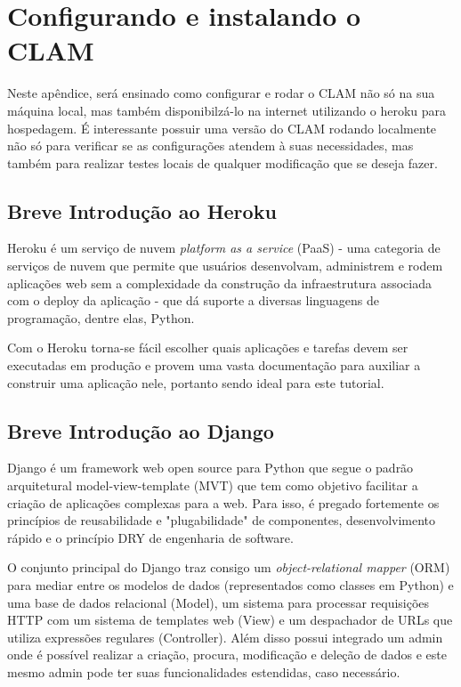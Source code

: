 \chapter{Configurando e instalando o CLAM}
\label{chap:clam}

Neste apêndice, será ensinado como configurar e rodar o CLAM não só na sua máquina
local, mas também disponibilzá-lo na internet utilizando o heroku para hospedagem.
É interessante possuir uma versão do CLAM rodando localmente não só para verificar
se as configurações atendem à suas necessidades, mas também para realizar testes locais
de qualquer modificação que se deseja fazer.

\section{Breve Introdução ao Heroku}

Heroku é um serviço de nuvem \textit{platform as a service} (PaaS) -  uma categoria de serviços de
nuvem que permite que usuários desenvolvam, administrem e rodem aplicações web sem a complexidade
da construção da infraestrutura associada com o deploy da aplicação -  que dá suporte a diversas
linguagens de programação, dentre elas, Python.

Com o Heroku torna-se fácil escolher quais aplicações e tarefas devem ser executadas em produção e
provem uma vasta documentação para auxiliar a construir uma aplicação nele, portanto sendo ideal
para este tutorial.

\section{Breve Introdução ao Django}

Django é um framework web open source para Python que segue o padrão arquitetural model-view-template
(MVT) que tem como objetivo facilitar a criação de aplicações complexas para a web. Para isso, é 
pregado fortemente os princípios de reusabilidade e "plugabilidade" de componentes, desenvolvimento
rápido e o princípio DRY de engenharia de software.

O conjunto principal do Django traz consigo um \textit{object-relational mapper} (ORM) para mediar
entre os modelos de dados (representados como classes em Python) e uma base de dados relacional 
(Model), um sistema para processar requisições HTTP com um sistema de templates web (View) e um
despachador de URLs que utiliza expressões regulares (Controller). Além disso possui integrado
um admin onde é possível realizar a criação, procura, modificação e deleção de dados e este mesmo
admin pode ter suas funcionalidades estendidas, caso necessário.

